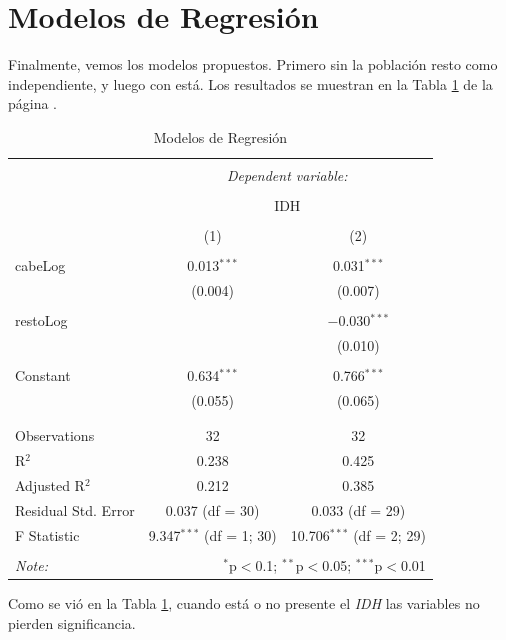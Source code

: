 \documentclass{article}
\begin{document}
\clearpage

\section{Modelos de Regresión}

Finalmente, vemos los modelos propuestos. Primero sin la población resto como independiente, y luego con está. Los resultados se muestran en la Tabla \ref{regresiones} de la página \pageref{regresiones}.


\begin{table}[!htbp] \centering 
  \caption{Modelos de Regresión} 
  \label{regresiones} 
\begin{tabular}{@{\extracolsep{5pt}}lcc} 
\\[-1.8ex]\hline 
\hline \\[-1.8ex] 
 & \multicolumn{2}{c}{\textit{Dependent variable:}} \\ 
\cline{2-3} 
\\[-1.8ex] & \multicolumn{2}{c}{IDH} \\ 
\\[-1.8ex] & (1) & (2)\\ 
\hline \\[-1.8ex] 
 cabeLog & 0.013$^{***}$ & 0.031$^{***}$ \\ 
  & (0.004) & (0.007) \\ 
  & & \\ 
 restoLog &  & $-$0.030$^{***}$ \\ 
  &  & (0.010) \\ 
  & & \\ 
 Constant & 0.634$^{***}$ & 0.766$^{***}$ \\ 
  & (0.055) & (0.065) \\ 
  & & \\ 
\hline \\[-1.8ex] 
Observations & 32 & 32 \\ 
R$^{2}$ & 0.238 & 0.425 \\ 
Adjusted R$^{2}$ & 0.212 & 0.385 \\ 
Residual Std. Error & 0.037 (df = 30) & 0.033 (df = 29) \\ 
F Statistic & 9.347$^{***}$ (df = 1; 30) & 10.706$^{***}$ (df = 2; 29) \\ 
\hline 
\hline \\[-1.8ex] 
\textit{Note:}  & \multicolumn{2}{r}{$^{*}$p$<$0.1; $^{**}$p$<$0.05; $^{***}$p$<$0.01} \\ 
\end{tabular} 
\end{table} 
Como se vió en la Tabla \ref{regresiones}, cuando está o no presente el \emph{IDH} las variables no pierden significancia.
\end{document}
